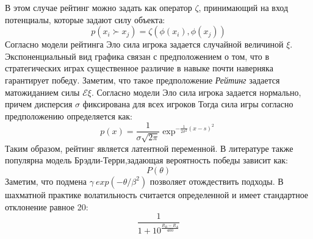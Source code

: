 В этом случае рейтинг можно задать как оператор $\zeta$, принимающий на вход потенциалы, которые задают силу объекта:
\begin{equation}
    p(x_i \succ x_j) = \zeta(\phi(x_i),\phi(x_j))
\end{equation}
Согласно модели рейтинга Эло сила игрока задается случайной величиной $\xi$. 
Экспоненциальный вид графика связан с предположением о том, что в стратегических играх существенное различие в навыке 
почти наверняка гарантирует победу. Заметим, что такое предположение 
\textit{Рейтинг} задается матожиданием силы $\mathcal{E} \xi$.
Согласно модели Эло сила игрока задается нормально, причем дисперсия $\sigma$ фиксирована для всех игроков
Тогда сила игры согласно предположению определяется как:
\begin{equation}
    p(x) = \frac{1}{\sigma \sqrt{2\pi}} \exp^{- \frac{1}{2\sigma^2}{(x-s)^2}}
\end{equation}
Таким образом, рейтинг является латентной переменной. В литературе также популярна модель Брэдли-Терри,задающая
вероятность победы зависит как:
\begin{equation}
    P(\theta)
\end{equation}
Заметим, что подмена $\gamma ~ exp(-\theta/\beta^2)$ позволяет отождествить подходы.
В шахматной практике волатильность считается определенной и имеет стандартное отклонение равное 20:
\begin{equation}
    \frac{1}{1+10^\frac{R_B-R_A}{400}} 
\end{equation}
